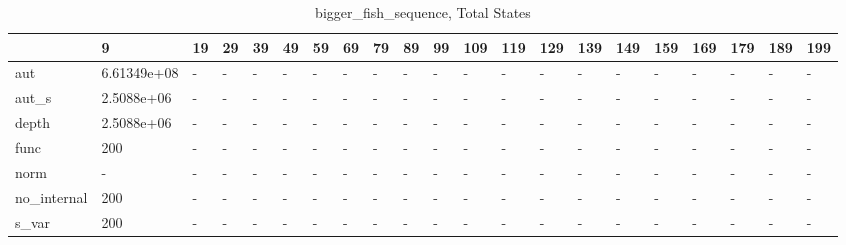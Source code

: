 \begin{table}
\caption{bigger_fish_sequence, Total States}
\label{bigger_fish_sequence_total}
\begin{tabular}{lllllllllllllllllllll}
\toprule
 & 9 & 19 & 29 & 39 & 49 & 59 & 69 & 79 & 89 & 99 & 109 & 119 & 129 & 139 & 149 & 159 & 169 & 179 & 189 & 199 \\
\midrule
aut & 6.61349e+08 & - & - & - & - & - & - & - & - & - & - & - & - & - & - & - & - & - & - & - \\
aut_s & 2.5088e+06 & - & - & - & - & - & - & - & - & - & - & - & - & - & - & - & - & - & - & - \\
depth & 2.5088e+06 & - & - & - & - & - & - & - & - & - & - & - & - & - & - & - & - & - & - & - \\
func & 200 & - & - & - & - & - & - & - & - & - & - & - & - & - & - & - & - & - & - & - \\
norm & - & - & - & - & - & - & - & - & - & - & - & - & - & - & - & - & - & - & - & - \\
no_internal & 200 & - & - & - & - & - & - & - & - & - & - & - & - & - & - & - & - & - & - & - \\
s_var & 200 & - & - & - & - & - & - & - & - & - & - & - & - & - & - & - & - & - & - & - \\
\bottomrule
\end{tabular}
\end{table}
